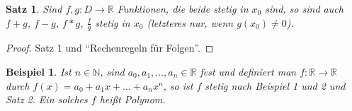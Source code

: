 \documentclass[a4paper,10pt]{article}
\newtheorem{example}{Beispiel}
\newtheorem{satz}{Satz}
\begin{document}
\begin{satz}
 Sind $f, g: D \rightarrow \mathbb{R}$ Funktionen, die beide stetig in $x_0$ sind, so sind auch $f + g$, $f - g$, $f * g$, $\frac{f}{g}$ stetig in $x_0$ (letzteres nur, wenn $g(x_0) \ne 0$).
\end{satz}

\begin{proof}
 Satz 1 und ``Rechenregeln für Folgen''.
\end{proof}

\begin{example}
 Ist $n \in \mathbb{N}$, sind $a_0, a_1, \dots, a_n \in \mathbb{R}$ fest und definiert man $f: \mathbb{R} \rightarrow \mathbb{R}$ durch $f(x) = a_0 + a_1x + \dots + a_nx^n$, so ist $f$ stetig nach Beispiel 1 und 2 und Satz 2.
 Ein solches $f$ heißt Polynom.
\end{example}
\end{document}
